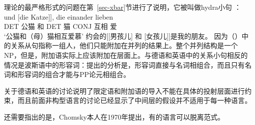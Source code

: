 \xbar 理论的最严格形式的问题在第~\ref{sec-xbar}节进行了说明，它被叫做hydra小句 \citep{PR70a,Link84a-u,Kiss2005a}：
\eal
\ex {}
\gll [[der Kater] und [die Katze]], die einander lieben\\
     \spacebr{}\spacebr{}DET 公猫 和 DET 猫 CONJ 互相 爱\\
\glt `公猫和（母）猫相互爱慕'
\ex {}约会的[[男孩儿] 和 [女孩儿]]是我的朋友。 
\zl
因为（）中的关系从句指称一组人，他们只能附加在并列的结果上。整个并列结构是一个NP，但是，附加语实际上应该附加在\xbar 层面上。与德语和英语中的关系小句相反的情况是波斯语中的形容词：\citet{Samvelian2007a}提出的分析是，形容词直接与名词相组合，而且只有名词和形容词的组合才能与PP论元相组合。

关于德语和英语的讨论说明了限定语和附加语的导入不能在具体的投射层面进行约束，而且前面非构型语言的讨论已经显示了中间层的假设并不适用于每一种语言。

还需要指出的是，Chomsky本人在1970年提出，有的语言可以脱离\xbar 范式\citeyearpar[]{Chomsky70a}。

